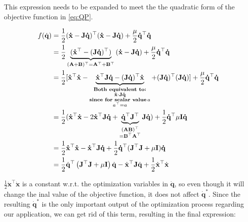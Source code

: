 This expression needs to be expanded to meet the the quadratic form of the objective function in \ref{eq:QP}.

\begin{equation*}
    \begin{split}
    f(\dot{\mathbf{q}}) & = \frac{1}{2} \mathbf{(\dot{x}-J\dot{q})^{\top} (\dot{x}-J\dot{q})} + \frac{\mu}{2} \mathbf{\dot{q}^{\top} \dot{q}}
    \\ & = \frac{1}{2} \underbrace{ ( \mathbf{\dot{x}^{\top}-(J\dot{q})^{\top}} )}_\mathbf{ (A+B)^{\top} = A^{\top} + B^{\top} }  \mathbf{(\dot{x}-J\dot{q})}  + \frac{\mu}{2} \mathbf{\dot{q}^{\top} \dot{q}}
    \\ & = \frac{1}{2} \mathbf{[ \dot{x}^{\top} \dot{x} - \underbrace{\mathbf{\dot{x}^{\top} J\dot{q} - (J\dot{q})^{\top} \dot{x}} }_{\substack{\emph{Both equivalent to:} \\ \mathbf{\dot{x} \cdot J\dot{q}} \\ \emph{since for scalar value} \, a \\ a^{\top} = a }} + (J\dot{q})^{\top} (J\dot{q}) ]} + \frac{\mu}{2} \mathbf{\dot{q}^{\top} \dot{q}}
    \\ & = \frac{1}{2} \mathbf{( \dot{x}^{\top} \dot{x}} - 2 \mathbf{ \dot{x}^{\top} J\dot{q} + \underbrace{\mathbf{\dot{q}^{\top} J^{\top}}}_{\substack{\mathbf{(AB)^{\top}} \\ = \mathbf{B^{\top}A^{\top}} }} J \dot{q} )} + \frac{1}{2} \mathbf{\dot{q}^{\top} \mu I \dot{q}}
    \\ & = \frac{1}{2} \mathbf{ \dot{x}^{\top} \dot{x} -  \dot{x}^{\top} J\dot{q} } + \frac{1}{2} \mathbf{\dot{q}^{\top} (J^{\top}J + \mu I) \dot{q}}
    \\ & = \frac{1}{2}\dot{\mathbf{q}}^{\top}\left(\mathbf{J}^{\top} \mathbf{J}+\mu \mathbf{I}\right) \dot{\mathbf{q}}-\dot{\mathbf{x}}^{\top} \mathbf{J} \dot{\mathbf{q}}+\frac{1}{2} \dot{\mathbf{x}}^{\top} \dot{\mathbf{x}}
    \end{split}
\end{equation*}

$\frac{1}{2} \dot{\mathbf{x}}^{\top} \dot{\mathbf{x}}$ is a constant w.r.t. the optimization variables in $\mathbf{\dot{q}}$, so even though it will change the inal value of the objective function, it does not affect $\mathbf{\dot{q}^{*}}$. Since the resulting $\mathbf{\dot{q}^{*}}$ is the only important output of the optimization process regarding our application, we can get rid of this term, resulting in the final expression:

